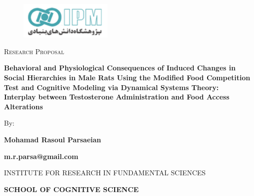 \documentclass[english, a4paper, 11pt]{article}
\title{}
\author{}
\date{}
\begin{document}
\begin{center}

    \null\vfill
    \begin{figure}[htp]
        \centering
        \includegraphics[width=0.4\textwidth]{figures/IPMLogo.png}
    \end{figure}

    {\scshape\large Research Proposal\par}

    \baselineskip

    {\LARGE\bfseries Behavioral and Physiological Consequences of Induced Changes in Social Hierarchies in Male Rats Using the Modified Food Competition Test and Cognitive Modeling via Dynamical Systems Theory: Interplay between Testosterone Administration and Food Access Alterations\par}

    \baselineskip

    By:\\[1ex]
    {\LARGE\bfseries Mohamad Rasoul Parsaeian\par}
    {\small\bfseries m.r.parsa@gmail.com\par}

    \baselineskip

    INSTITUTE FOR RESEARCH
    IN FUNDAMENTAL SCIENCES\\[1ex]
    {\large\bfseries SCHOOL OF COGNITIVE SCIENCE\par}

\end{center}

\vfill

\begin{abstract}
    This research investigates the behavioral and physiological impacts of induced changes in social hierarchies among male rats using an automated system that controls food access through RFID-tagged interactions. Integrating theories such as the frustration-aggression hypothesis (FAH) and dominance hierarchy (DH), we examine how testosterone administration and food access alterations influence social dynamics, aggression, and stress responses within dyads of rats. Control theory principles are employed to design a Social System(SS) where an automated pellet dispenser and testosterone serve as actuators to manipulate or alter social status. Behavioral and physiological data will be collected and analyzed to elucidate the mechanisms underlying social hierarchy formation and maintenance, contributing to the broader understanding of social behavior and its neurobiological foundations.
\end{abstract}
\end{document}
